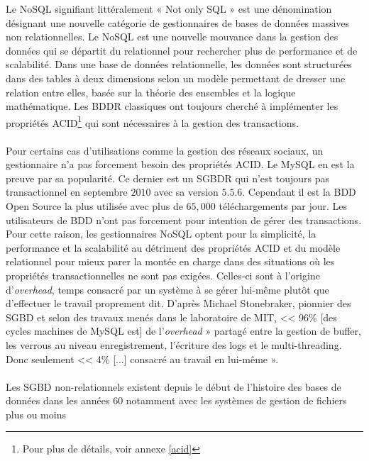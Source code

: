 Le \textsf{NoSQL} signifiant littéralement « \textsf{Not only SQL} »
est une dénomination désignant une nouvelle catégorie de gestionnaires
de bases de données massives non relationnelles. Le \textsf{NoSQL} est une nouvelle
mouvance dans la gestion des données qui se départit du relationnel 
pour rechercher plus de performance et de scalabilité\cite{RickCattell}. Dans une
base de données relationnelle, les données sont structurées dans des
tables à deux dimensions selon un modèle permettant de dresser une
relation entre elles, basée sur la théorie des ensembles et la logique
mathématique\cite{BDDR}. Les \textsf{BDDR} classiques ont toujours cherché à
implémenter les propriétés \textsf{ACID}\footnote{Pour plus de détails, voir annexe
  \ref{acid}}\cite{DanielBartholomew} qui sont nécessaires à la gestion des
transactions.  
\\ 
\\ 
Pour certains cas d'utilisations comme la gestion des réseaux sociaux,
un gestionnaire n'a pas forcement besoin des
propriétés \textsf{ACID}. Le
\textsf{MySQL} en est la preuve par sa popularité. Ce dernier est un \textsf{SGBDR} qui n'est toujours  
pas transactionnel en septembre $2010$ avec sa version $5.5.6$\cite{MySQLACID}. Cependant il est la \textsf{BDD} \textsf{Open Source} la
plus utilisée avec plus de $65,000$ téléchargements par
jour\cite{siteMySQL}. Les utilisateurs de \textsf{BDD} n'ont pas
forcement pour intention de gérer des transactions. Pour cette raison,
les gestionnaires \textsf{NoSQL} optent pour la simplicité, la
performance et la scalabilité au détriment des propriétés
\textsf{ACID} et du modèle relationnel pour mieux parer la montée en
charge dans des situations où les propriétés transactionnelles ne sont
pas exigées. Celles-ci sont à l'origine d'\textit{overhead}, temps
consacré par un système à se gérer lui-même plutôt que d'effectuer le
travail proprement dit. D'après \textsf{Michael Stonebraker}, pionnier
des \textsf{SGBD} et selon des travaux menés dans le laboratoire
de \textsf{MIT}, << 96\% [des cycles machines de \textsf{MySQL} est] de
l’\textit{overhead} » partagé entre la gestion de \textsf{buffer}, les
verrous au niveau enregistrement, l’écriture des \textsf{logs} et
le \textsf{multi-threading}. Donc seulement << 4\% [...] consacré au
travail en lui-même »\cite{MichaelStonebraker}.
\\ 
\\ 
Les \textsf{SGBD} non-relationnels existent depuis
le début de l'histoire des bases de données dans les années $60$
notamment avec les systèmes de gestion de fichiers plus ou moins

